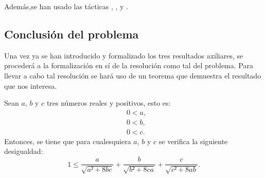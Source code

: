 
Además,se han usado las tácticas
,
,
 y
.

\subsection{Conclusión del problema}

Una vez ya se han introducido y formalizado los tres resultados
axiliares, se procederá a la formalización en sí de la resolución como
tal del problema. Para llevar a cabo tal resolución se hará uso de un
teorema que demuestra el resultado que nos interesa.

\begin{teorema}
  Sean \(a\), \(b\) y \(c\) tres números reales y positivos, esto es:
  \begin{align}
    &0 < a, \label{haq2te}\tag{ha}\\
    &0 < b, \label{hbq2te}\tag{hb}\\
    &0 < c. \label{hcq2te}\tag{hc}
  \end{align}
  Entonces, se tiene que para cualesquiera \(a\), \(b\) y \(c\) se
  verifica la siguiente desigualdad:
  \begin{equation}\label{eqfinal}
    1 ≤ \frac{a}{\sqrt{a²+8bc}}+\frac{b}{\sqrt{b²+8ca}}+
        \frac{c}{\sqrt{c²+8ab}}.
  \end{equation}
\end{teorema}

